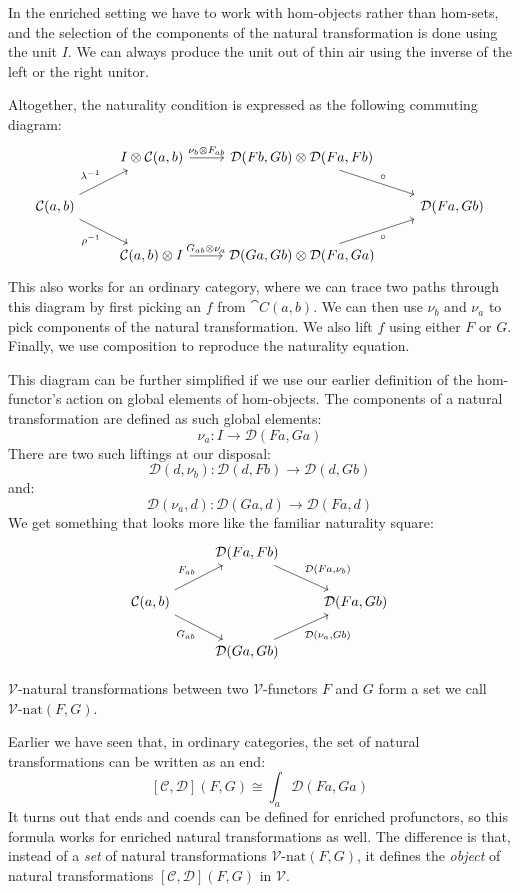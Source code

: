 \documentclass[DaoFP]{subfiles}
\begin{document}
In the enriched setting we have to work with hom-objects rather than hom-sets, and the selection of the components of the natural transformation is done using the unit $I$. We can always produce the unit out of thin air using the inverse of the left or the right unitor. 

Altogether, the naturality condition is expressed as the following commuting diagram:
\[
 \begin{tikzcd}
 & I \otimes \mathcal C(a, b)
 \arrow[r, "\nu_b \otimes F_{a b}"]
 & \mathcal D(F b, G b) \otimes \mathcal D(F a, F b)
 \arrow[dr, "\circ"]
 \\
 \mathcal C(a, b)
 \arrow[ur, "\lambda^{-1}"]
\arrow[dr, "\rho^{-1}"']
 &&& \mathcal D(F a, G b)
 \\
 & \mathcal C(a, b) \otimes I 
 \arrow[r, "G_{a b} \otimes \nu_a"]
 & \mathcal D(G a, G b) \otimes \mathcal D(F a, G a)
 \arrow[ur, "\circ"']
  \end{tikzcd}
\]
This also works for an ordinary category, where we can trace two paths through this diagram by first picking an $f$ from $\cat C(a, b)$. We can then use $\nu_b$ and $\nu_a$ to pick components of the natural transformation. We also lift $f$ using either $F$ or $G$. Finally, we use composition to reproduce the naturality equation.

This diagram can be further simplified if we use our earlier definition of  the hom-functor's action on global elements of hom-objects. The components of a natural transformation are defined as such global elements:
\[ \nu_a \colon I \to \mathcal D(F a, G a) \]
There are two such liftings at our disposal:
\[ \mathcal D(d, \nu_b) \colon \mathcal D(d, F b) \to \mathcal D(d, G b) \]
and:
\[ \mathcal D (\nu_a, d) \colon \mathcal D(G a, d) \to \mathcal D(F a, d) \]
We get something that looks more like the familiar naturality square:
\[
 \begin{tikzcd}
 & \mathcal D(F a, F b)
  \arrow[dr, "{\mathcal D (F a, \nu_b)}"]
 \\
 \mathcal C(a, b) 
 \arrow[ur, "F_{a b}"]
 \arrow[dr, "G_{a b}"']
 && \mathcal D(F a, G b)
 \\
& \mathcal D (G a, G b)
\arrow[ur, "{\mathcal D (\nu_a, G b)}"']
 \end{tikzcd}
\]


$\mathcal V$-natural transformations between two $\mathcal V$-functors $F$ and $G$ form a set we call $\mathcal V\text{-nat} (F, G)$. 

Earlier we have seen that, in ordinary categories, the set of natural transformations can be written as an end:
\[ [\mathcal C, \mathcal D](F, G) \cong \int_a \mathcal D(F a, G a) \]
It turns out that ends and coends can be defined for enriched profunctors, so this formula works for enriched natural transformations as well. The difference is that, instead of a \emph{set} of natural transformations $\mathcal V\text{-nat} (F, G)$, it defines the \emph{object} of natural transformations $[\mathcal C, \mathcal D](F, G)$ in $\mathcal V$. 
\end{document}
